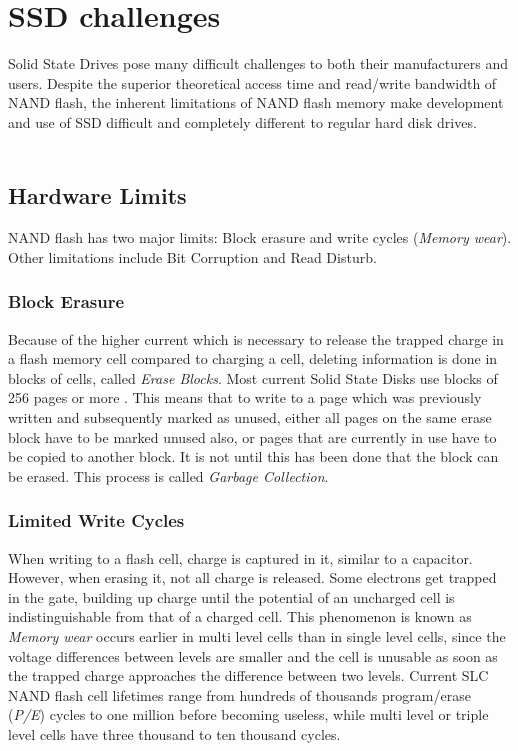 \documentclass{acm_proc_article-sp}
\begin{document}
\section{SSD challenges}
Solid State Drives pose many difficult challenges to both their manufacturers and users. Despite the superior theoretical access time and read/write bandwidth of NAND flash, the inherent limitations of NAND flash memory make development and use of SSD difficult and completely different to regular hard disk drives.
\\
\\
\subsection{Hardware Limits}
NAND flash has two major limits: Block erasure and write cycles (\emph{Memory wear}). Other limitations include Bit Corruption and Read Disturb.

\subsubsection*{Block Erasure}
Because of the higher current which is necessary to release the trapped charge in a flash memory cell compared to charging a cell, deleting information is done in blocks of cells, called \emph{Erase Blocks}. Most current Solid State Disks use blocks of 256 pages or more \cite{codecapsule2014coding}.
This means that to write to a page which was previously written and subsequently marked as unused, either all pages on the same erase block have to be marked unused also, or pages that are currently in use have to be copied to another block. It is not until this has been done that the block can be erased. This process is called \emph{Garbage Collection}.

\subsubsection*{Limited Write Cycles}
When writing to a flash cell, charge is captured in it, similar to a capacitor.
However, when erasing it, not all charge is released. Some electrons get trapped in the gate, building up charge until the potential of an uncharged cell is indistinguishable from that of a charged cell. This phenomenon is known as \emph{Memory wear} occurs earlier in multi level cells than in single level cells, since the voltage differences between levels are smaller and the cell is unusable as soon as the trapped charge approaches the difference between two levels.
Current SLC NAND flash cell lifetimes range from hundreds of thousands program/erase (\emph{P/E}) cycles to one million before becoming useless, while multi level or triple level cells have three thousand to ten thousand cycles.
\end{document}
